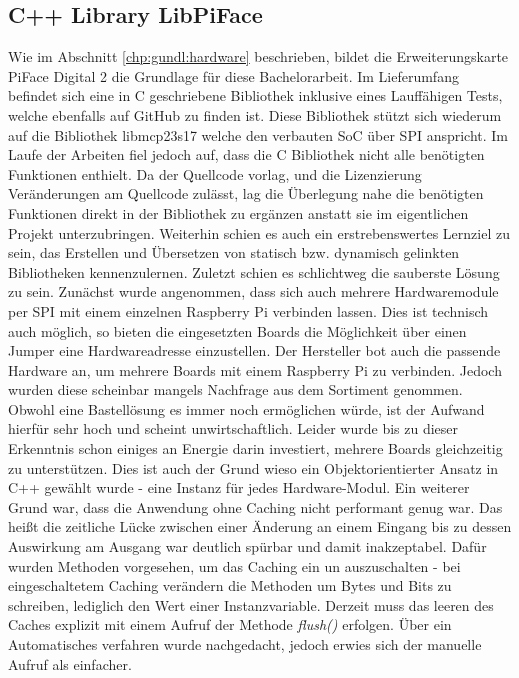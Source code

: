 \subsection{C++ Library LibPiFace}
Wie im Abschnitt \ref{chp:gundl:hardware} beschrieben, bildet die Erweiterungskarte PiFace Digital 2 \cite{URL:PiFaceDigital2} die Grundlage für diese Bachelorarbeit. Im Lieferumfang befindet sich eine in C geschriebene Bibliothek inklusive eines Lauffähigen Tests, welche ebenfalls auf GitHub \cite{URL:PiFaceDigital2GIT} zu finden ist. Diese Bibliothek stützt sich wiederum auf die Bibliothek libmcp23s17 \cite{URL:libmcp23s17} welche den verbauten SoC über SPI anspricht. Im Laufe der Arbeiten fiel jedoch auf, dass die C Bibliothek nicht alle benötigten Funktionen enthielt. Da der Quellcode vorlag, und die Lizenzierung Veränderungen am Quellcode zulässt, lag die Überlegung nahe die benötigten Funktionen direkt in der Bibliothek zu ergänzen anstatt sie im eigentlichen Projekt unterzubringen. Weiterhin schien es auch ein erstrebenswertes Lernziel zu sein, das Erstellen und Übersetzen von statisch bzw. dynamisch gelinkten Bibliotheken kennenzulernen. Zuletzt schien es schlichtweg die sauberste Lösung zu sein. Zunächst wurde angenommen, dass sich auch mehrere Hardwaremodule per SPI mit einem einzelnen Raspberry Pi verbinden lassen. Dies ist technisch auch möglich, so bieten die eingesetzten Boards die Möglichkeit über einen Jumper eine Hardwareadresse einzustellen. Der Hersteller bot auch die passende Hardware an, um mehrere Boards mit einem Raspberry Pi zu verbinden. Jedoch wurden diese scheinbar mangels Nachfrage aus dem Sortiment genommen. Obwohl eine Bastellösung es immer noch ermöglichen würde, ist der Aufwand hierfür sehr hoch und scheint unwirtschaftlich. Leider wurde bis zu dieser Erkenntnis schon einiges an Energie darin investiert, mehrere Boards gleichzeitig zu unterstützen. Dies ist auch der Grund wieso ein Objektorientierter Ansatz in C++ gewählt wurde - eine Instanz für jedes Hardware-Modul. Ein weiterer Grund war, dass die Anwendung ohne Caching nicht performant genug war. Das heißt die zeitliche Lücke zwischen einer Änderung an einem Eingang bis zu dessen Auswirkung am Ausgang war deutlich spürbar und damit inakzeptabel. Dafür wurden Methoden vorgesehen, um das Caching ein un auszuschalten - bei eingeschaltetem Caching verändern die Methoden um Bytes und Bits zu schreiben, lediglich den Wert einer Instanzvariable. Derzeit muss das leeren des Caches explizit mit einem Aufruf der Methode \textit{flush()} erfolgen. Über ein Automatisches verfahren wurde nachgedacht, jedoch erwies sich der manuelle Aufruf als einfacher. 

